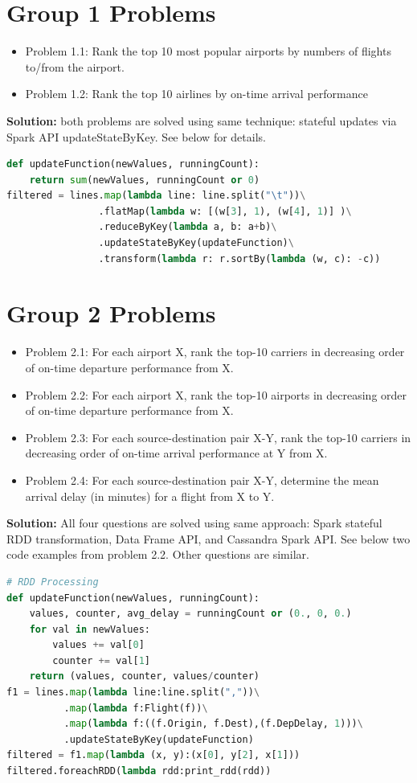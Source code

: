 \documentclass[fontsize=11pt,paper=a4]{scrartcl}
\begin{document}
\section{Group 1 Problems} 
\begin{itemize} 
\item Problem 1.1: Rank the top 10 most popular airports by numbers of flights to/from the airport.
\item Problem 1.2: Rank the top 10 airlines by on-time arrival performance
\end{itemize}
\textbf{Solution:} both problems are solved using same technique: stateful updates via Spark API updateStateByKey. See below for details. 
\begin{lstlisting}[basicstyle=\small,language = python] 
def updateFunction(newValues, runningCount):
    return sum(newValues, runningCount or 0)
filtered = lines.map(lambda line: line.split("\t"))\
                .flatMap(lambda w: [(w[3], 1), (w[4], 1)] )\
                .reduceByKey(lambda a, b: a+b)\
                .updateStateByKey(updateFunction)\
                .transform(lambda r: r.sortBy(lambda (w, c): -c))
\end{lstlisting}
\section{Group 2 Problems}
\begin{itemize} 
\item Problem 2.1: For each airport X, rank the top-10 carriers in decreasing order of on-time departure performance from X. 
\item Problem 2.2: For each airport X, rank the top-10 airports in decreasing order of on-time departure performance from X.
\item Problem 2.3: For each source-destination pair X-Y, rank the top-10 carriers in decreasing order of on-time arrival performance at Y from X.
\item Problem 2.4: For each source-destination pair X-Y, determine the mean arrival delay (in minutes) for a flight from X to Y.
\end{itemize}
\textbf{Solution:} All four questions are solved using same approach: Spark stateful RDD transformation, Data Frame API, and Cassandra Spark API. See below two code examples from problem 2.2. Other questions are similar. 
\begin{lstlisting}[basicstyle=\small,language = python] 
# RDD Processing
def updateFunction(newValues, runningCount):
    values, counter, avg_delay = runningCount or (0., 0, 0.)
    for val in newValues: 
        values += val[0]
        counter += val[1]
    return (values, counter, values/counter) 
f1 = lines.map(lambda line:line.split(","))\
          .map(lambda f:Flight(f))\
          .map(lambda f:((f.Origin, f.Dest),(f.DepDelay, 1)))\
          .updateStateByKey(updateFunction)
filtered = f1.map(lambda (x, y):(x[0], y[2], x[1]))
filtered.foreachRDD(lambda rdd:print_rdd(rdd))
\end{lstlisting}
\end{document}

